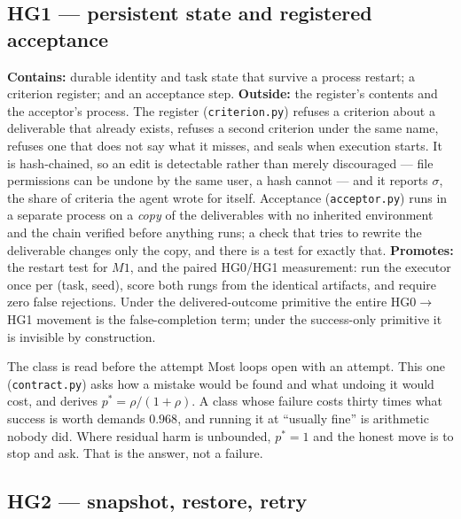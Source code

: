 \subsection{HG1 --- persistent state and registered acceptance}

\textbf{Contains:} durable identity and task state that survive a process restart; a criterion register; and an acceptance step. \textbf{Outside:} the register's contents and the acceptor's process. The register (\texttt{criterion.py}) refuses a criterion about a deliverable that already exists, refuses a second criterion under the same name, refuses one that does not say what it misses, and seals when execution starts. It is hash-chained, so an edit is detectable rather than merely discouraged --- file permissions can be undone by the same user, a hash cannot --- and it reports $\sigma$, the share of criteria the agent wrote for itself. Acceptance (\texttt{acceptor.py}) runs in a separate process on a \emph{copy} of the deliverables with no inherited environment and the chain verified before anything runs; a check that tries to rewrite the deliverable changes only the copy, and there is a test for exactly that. \textbf{Promotes:} the restart test for $M1$, and the paired HG0/HG1 measurement: run the executor once per (task, seed), score both rungs from the identical artifacts, and require zero false rejections. Under the delivered-outcome primitive the entire HG0$\to$HG1 movement is the false-completion term; under the success-only primitive it is invisible by construction.

\begin{cautionbox}{The class is read before the attempt}
Most loops open with an attempt. This one (\texttt{contract.py}) asks how a mistake would be found and what undoing it would cost, and derives $p^{*} = \rho/(1+\rho)$. A class whose failure costs thirty times what success is worth demands $0.968$, and running it at ``usually fine'' is arithmetic nobody did. Where residual harm is unbounded, $p^{*} = 1$ and the honest move is to stop and ask. That is the answer, not a failure.
\end{cautionbox}

\subsection{HG2 --- snapshot, restore, retry}

